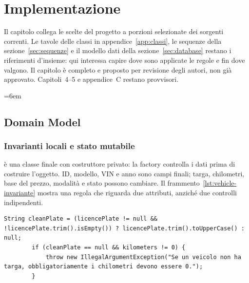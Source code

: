 \chapter{Implementazione}\label{ch:implementazione}
Il capitolo collega le scelte del progetto a porzioni selezionate dei sorgenti
correnti. Le tavole delle classi in appendice~\ref{app:classi}, le sequenze
della sezione~\ref{sec:sequenze} e il modello dati della
sezione~\ref{sec:database} restano i riferimenti d'insieme: qui interessa
capire dove sono applicate le regole e fin dove valgono.
Il capitolo è completo e proposto per revisione degli autori, non già
approvato. Capitoli~4--5 e appendice~C restano provvisori.

\begingroup
\emergencystretch=6em
\renewcommand{\lstlistingname}{Frammento}

\section{Domain Model}\label{sec:impl-dominio}
\subsection{Invarianti locali e stato mutabile}
 è una classe finale con costruttore privato: la factory
 controlla i dati prima di costruire l'oggetto. ID, modello,
VIN e anno sono campi finali; targa, chilometri, base del prezzo, modalità
e stato possono cambiare. Il frammento~\ref{lst:vehicle-invariante}
mostra una regola che riguarda due attributi, anziché due controlli
indipendenti.

\noindent\begin{minipage}{\linewidth}
\begin{lstlisting}[firstnumber=59,caption={\code{Vehicle.java}: normalizzazione della targa e coerenza con i chilometri.},
  label=lst:vehicle-invariante]
        String cleanPlate = (licencePlate != null && !licencePlate.trim().isEmpty()) ? licencePlate.trim().toUpperCase() : null;
        if (cleanPlate == null && kilometers != 0) {
            throw new IllegalArgumentException("Se un veicolo non ha targa, obbligatoriamente i chilometri devono essere 0.");
        }
\end{lstlisting}
\end{minipage}


